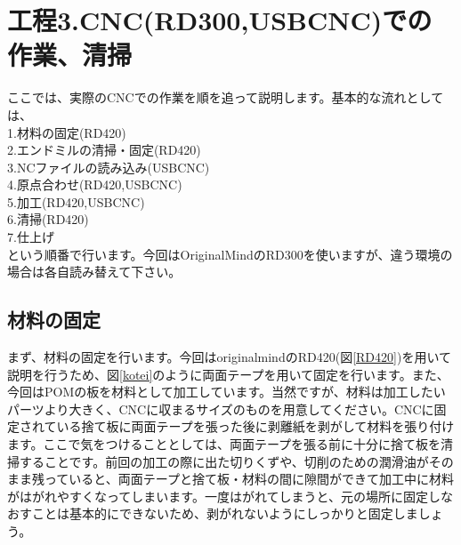 \documentclass[b5paper, 9pt, twocolumn, titlepage,openany]{jsbook}%
\begin{document}
\clearpage
\section{工程3.CNC(RD300,USBCNC)での作業、清掃}
ここでは、実際のCNCでの作業を順を追って説明します。基本的な流れとしては、\\
  1.材料の固定(RD420)\\
  2.エンドミルの清掃・固定(RD420)\\
  3.NCファイルの読み込み(USBCNC)\\
  4.原点合わせ(RD420,USBCNC)\\
  5.加工(RD420,USBCNC)\\
  6.清掃(RD420)\\
  7.仕上げ\\
  という順番で行います。今回はOriginalMindのRD300を使いますが、違う環境の場合は各自読み替えて下さい。\\

\subsection{材料の固定}
まず、材料の固定を行います。今回はoriginalmindのRD420(図\ref{RD420})を用いて説明を行うため、図\ref{kotei}のように両面テープを用いて固定を行います。また、今回はPOMの板を材料として加工しています。当然ですが、材料は加工したいパーツより大きく、CNCに収まるサイズのものを用意してください。CNCに固定されている捨て板に両面テープを張った後に剥離紙を剥がして材料を張り付けます。ここで気をつけることとしては、両面テープを張る前に十分に捨て板を清掃することです。前回の加工の際に出た切りくずや、切削のための潤滑油がそのまま残っていると、両面テープと捨て板・材料の間に隙間ができて加工中に材料がはがれやすくなってしまいます。一度はがれてしまうと、元の場所に固定しなおすことは基本的にできないため、剥がれないようにしっかりと固定しましょう。\\
\end{document}
